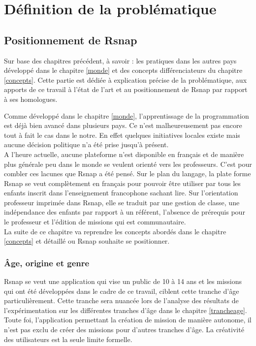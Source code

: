 \chapter{Définition de la problématique}
\section{Positionnement de Rsnap}
Sur base des chapitres précédent, à savoir : les pratiques dans les autres pays développé dans le chapitre \ref{monde} et des concepts différenciateurs du chapitre \ref{concepts}. Cette partie est dédiée à explication précise de la problématique, aux apports de ce travail à l'état de l'art et au positionnement de Rsnap par rapport à ses homologues.

Comme développé dans le chapitre \ref{monde}, l'apprentissage de la programmation est déjà bien avancé dans plusieurs pays. Ce n'est malheureusement pas encore tout à fait le cas dans le notre. En effet quelques initiatives locales existe mais aucune décision politique n'a été prise jusqu'à présent.\\

A l'heure actuelle, aucune plateforme n'est disponible en français et de manière plus générale peu dans le monde se veulent orienté vers les professeurs. C'est pour combler ces lacunes que Rsnap a été pensé. Sur le plan du langage, la plate forme Rsnap se veut complètement en français pour pouvoir être utiliser par tous les enfants inscrit dans l'enseignement francophone sachant lire. Sur l'orientation professeur imprimée dans Rsnap, elle se traduit par une gestion de classe, une indépendance des enfants par rapport à un référent, l'absence de prérequis pour le professeur et l'édition de missions qui est communautaire.\\

La suite de ce chapitre va reprendre les concepts abordés dans le chapitre \ref{concepts} et détaillé ou Rsnap souhaite se positionner.

\subsection{Âge, origine et genre} 
Rsnap se veut une application qui vise un public de 10 à 14 ans et les missions qui ont été développées dans le cadre de ce travail, ciblent cette tranche d'âge particulièrement. Cette tranche sera nuancée lors de l'analyse des résultats de l'expérimentation sur les différentes tranches d'âge dans le chapitre \ref{trancheage}. %
Toute foi, l'application permettant la création de mission de manière autonome, il n'est pas exclu de créer des missions pour d'autres tranches d'âge. La créativité des utilisateurs est la seule limite formelle.\\

